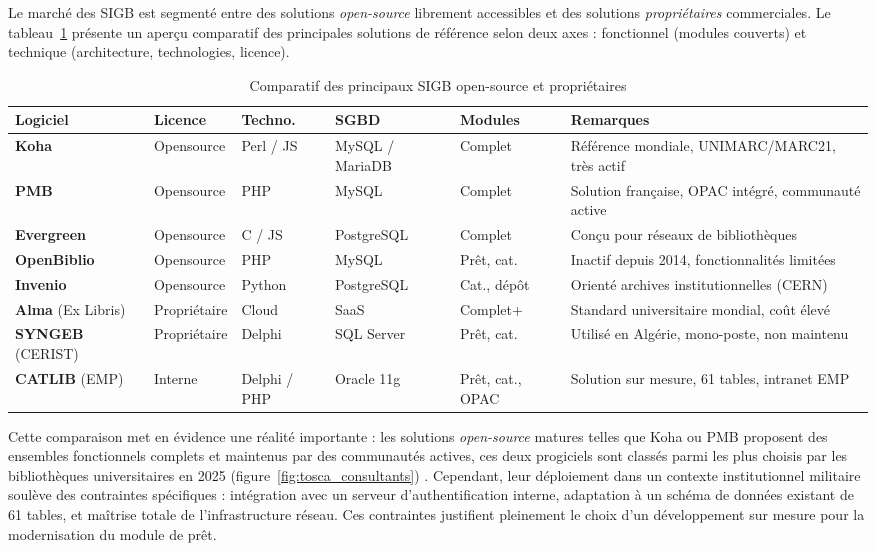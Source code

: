 Le marché des SIGB est segmenté entre des solutions \emph{open-source}
librement accessibles et des solutions \emph{propriétaires} commerciales.
Le tableau~\ref{tab:comparatif_sigb} présente un aperçu comparatif des
principales solutions de référence selon deux axes : fonctionnel (modules
couverts) et technique (architecture, technologies, licence).
\begin{table}[H]
\centering
\caption{Comparatif des principaux SIGB open-source et propriétaires}
\label{tab:comparatif_sigb}
\renewcommand{\arraystretch}{1.4}
\small

\begin{tabularx}{\textwidth}{|p{2.1cm}|p{1.9cm}|p{1.5cm}|p{1.9cm}|p{1.5cm}|X|}
\hline
\textbf{Logiciel} & \textbf{Licence} & \textbf{Techno.} & \textbf{SGBD} &
\textbf{Modules} & \textbf{Remarques} \\
\hline
\textbf{Koha} & Opensource & Perl / JS & MySQL / MariaDB &
Complet & Référence mondiale, UNIMARC/MARC21, très actif \\
\hline
\textbf{PMB} & Opensource & PHP & MySQL &
Complet & Solution française, OPAC intégré, communauté active \\
\hline
\textbf{Evergreen} & Opensource & C / JS & PostgreSQL &
Complet & Conçu pour réseaux de bibliothèques \\
\hline
\textbf{OpenBiblio} & Opensource & PHP & MySQL &
Prêt, cat. & Inactif depuis 2014, fonctionnalités limitées \\
\hline
\textbf{Invenio} & Opensource & Python & PostgreSQL &
Cat., dépôt & Orienté archives institutionnelles (CERN) \\
\hline
\textbf{Alma} (Ex Libris) & Propriétaire & Cloud & SaaS &
Complet+ & Standard universitaire mondial, coût élevé \\
\hline
\textbf{SYNGEB} (CERIST) & Propriétaire & Delphi & SQL Server &
Prêt, cat. & Utilisé en Algérie, mono-poste, non maintenu \\
\hline
\textbf{CATLIB} (EMP) & Interne & Delphi / PHP & Oracle 11g &
Prêt, cat., OPAC & Solution sur mesure, 61 tables, intranet EMP \\
\hline
\end{tabularx}
\end{table}

\FloatBarrier
\newpage
Cette comparaison met en évidence une réalité importante : les solutions
\emph{open-source} matures telles que Koha ou PMB proposent des ensembles
fonctionnels complets et maintenus par des communautés actives, ces deux progiciels sont classés parmi les plus choisis par les bibliothèques universitaires en 2025 (figure~\ref{fig:tosca_consultants}) . Cependant,
leur déploiement dans un contexte institutionnel militaire soulève des
contraintes spécifiques : intégration avec un serveur d'authentification
interne, adaptation à un schéma de données existant de 61 tables, et
maîtrise totale de l'infrastructure réseau. Ces contraintes justifient
pleinement le choix d'un développement sur mesure pour la modernisation
du module de prêt.

